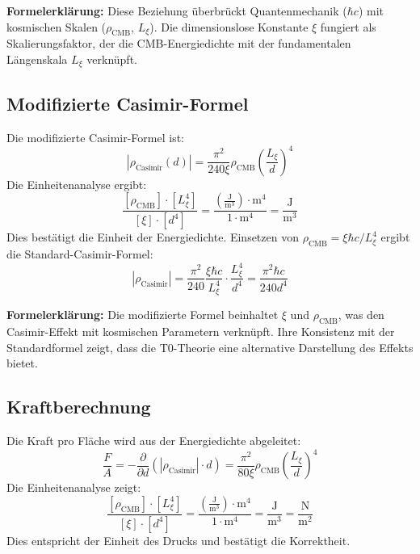 \documentclass[12pt,a4paper]{article}
\begin{document}
	\textbf{Formelerklärung:} Diese Beziehung überbrückt Quantenmechanik ($\hbar c$) mit kosmischen Skalen ($\rho_{\text{CMB}}$, $L_\xi$). Die dimensionslose Konstante $\xi$ fungiert als Skalierungsfaktor, der die CMB-Energiedichte mit der fundamentalen Längenskala $L_\xi$ verknüpft.
	
	\subsection{Modifizierte Casimir-Formel}
	Die modifizierte Casimir-Formel ist:
	\begin{equation}
		|\rho_{\text{Casimir}}(d)| = \frac{\pi^2}{240 \xi} \rho_{\text{CMB}} \left( \frac{L_\xi}{d} \right)^4
	\end{equation}
	Die Einheitenanalyse ergibt:
	\begin{equation}
		\frac{[\rho_{\text{CMB}}] \cdot [L_\xi^4]}{[\xi] \cdot [d^4]} = \frac{\left( \frac{\text{J}}{\text{m}^3} \right) \cdot \text{m}^4}{1 \cdot \text{m}^4} = \frac{\text{J}}{\text{m}^3}
	\end{equation}
	Dies bestätigt die Einheit der Energiedichte. Einsetzen von $\rho_{\text{CMB}} = \xi \hbar c / L_\xi^4$ ergibt die Standard-Casimir-Formel:
	\begin{equation}
		|\rho_{\text{Casimir}}| = \frac{\pi^2}{240} \frac{\xi \hbar c}{L_\xi^4} \cdot \frac{L_\xi^4}{d^4} = \frac{\pi^2 \hbar c}{240 d^4}
	\end{equation}
	
	\textbf{Formelerklärung:} Die modifizierte Formel beinhaltet $\xi$ und $\rho_{\text{CMB}}$, was den Casimir-Effekt mit kosmischen Parametern verknüpft. Ihre Konsistenz mit der Standardformel zeigt, dass die T0-Theorie eine alternative Darstellung des Effekts bietet.
	
	\subsection{Kraftberechnung}
	Die Kraft pro Fläche wird aus der Energiedichte abgeleitet:
	\begin{equation}
		\frac{F}{A} = -\frac{\partial}{\partial d} \left( |\rho_{\text{Casimir}}| \cdot d \right) = \frac{\pi^2}{80 \xi} \rho_{\text{CMB}} \left( \frac{L_\xi}{d} \right)^4
	\end{equation}
	Die Einheitenanalyse zeigt:
	\begin{equation}
		\frac{[\rho_{\text{CMB}}] \cdot [L_\xi^4]}{[\xi] \cdot [d^4]} = \frac{\left( \frac{\text{J}}{\text{m}^3} \right) \cdot \text{m}^4}{1 \cdot \text{m}^4} = \frac{\text{J}}{\text{m}^3} = \frac{\text{N}}{\text{m}^2}
	\end{equation}
	Dies entspricht der Einheit des Drucks und bestätigt die Korrektheit.
	
\end{document}
